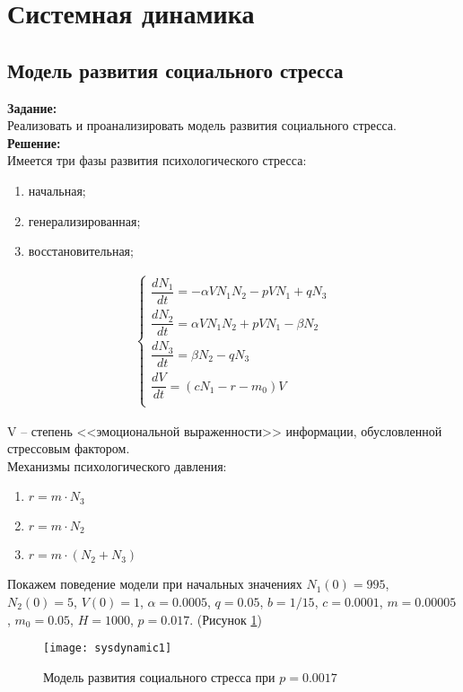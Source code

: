 \section*{Системная динамика}
\subsection*{Модель развития социального стресса}

\textbf{Задание:}\\
Реализовать и проанализировать модель развития социального стресса.\\

\textbf{Решение:}\\
Имеется три фазы развития психологического стресса:
\begin{enumerate}[topsep=0pt,itemsep=-1ex,partopsep=1ex,parsep=1ex]
	\item начальная;
	\item генерализированная;
	\item восстановительная;
\end{enumerate}

\begin{align*}
	\begin{cases}
		\dfrac{dN_1}{dt} = -\alpha V N_1 N_2 - p V N_1 + q N_3\\[10pt]
		\dfrac{dN_2}{dt} = \alpha V N_1 N_2 + p V N_1 - \beta N_2\\[10pt]
		\dfrac{dN_3}{dt} = \beta N_2 - q N_3\\[10pt]
		\dfrac{dV}{dt} = (cN_1 -r - m_0) V\\
	\end{cases}
\end{align*}

V -- степень <<эмоциональной выраженности>> информации, обусловленной стрессовым фактором.\\

Механизмы психологического давления:
\begin{enumerate}[topsep=0pt,itemsep=-1ex,partopsep=1ex,parsep=1ex]
	\item $r = m \cdot N_3$
	\item $r = m \cdot N_2$
	\item $r = m \cdot (N_2 + N_3)$
\end{enumerate}

\newpage

Покажем поведение модели при начальных значениях $N_1(0) = 995$, $N_2(0) = 5$, $V(0) = 1$, $\alpha = 0.0005$, $q = 0.05$, $b = 1/15$, $c = 0.0001$, $m = 0.00005$, $m_0 = 0.05$, $H = 1000$, $p = 0.017$. (Рисунок \ref{fig:sysdynamic1})
\begin{figure}[h]
	\centering \texttt{[image: sysdynamic1]}
	\caption{Модель развития социального стресса при $p = 0.0017$}
	\label{fig:sysdynamic1}
\end{figure}

